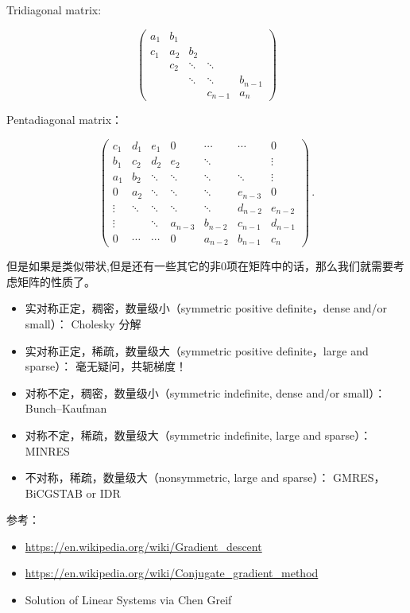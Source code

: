 \documentclass[
]{book}
\providecommand{\tightlist}{%
  \setlength{\itemsep}{0pt}\setlength{\parskip}{0pt}}
\begin{document}
Tridiagonal matrix:

\[
\begin{pmatrix}
a_1 & b_1 \\
c_1 & a_2 & b_2 \\
& c_2 & \ddots & \ddots \\
& & \ddots & \ddots & b_{n-1} \\
& & & c_{n-1} & a_n
\end{pmatrix}
\]

Pentadiagonal matrix：

\[
{\displaystyle {\begin{pmatrix}c_{1}&d_{1}&e_{1}&0&\cdots &\cdots &0\\b_{1}&c_{2}&d_{2}&e_{2}&\ddots &&\vdots \\a_{1}&b_{2}&\ddots &\ddots &\ddots &\ddots &\vdots \\0&a_{2}&\ddots &\ddots &\ddots &e_{n-3}&0\\\vdots &\ddots &\ddots &\ddots &\ddots &d_{n-2}&e_{n-2}\\\vdots &&\ddots &a_{n-3}&b_{n-2}&c_{n-1}&d_{n-1}\\0&\cdots &\cdots &0&a_{n-2}&b_{n-1}&c_{n}\end{pmatrix}}\,.}
\]

但是如果是类似带状,但是还有一些其它的非0项在矩阵中的话，那么我们就需要考虑矩阵的性质了。

\begin{itemize}
\tightlist
\item
  实对称正定，稠密，数量级小（symmetric positive definite，dense and/or small）： Cholesky 分解
\item
  实对称正定，稀疏，数量级大（symmetric positive definite，large and sparse）： 毫无疑问，共轭梯度！
\item
  对称不定，稠密，数量级小（symmetric indefinite, dense and/or small）：Bunch--Kaufman
\item
  对称不定，稀疏，数量级大（symmetric indefinite, large and sparse）： MINRES
\item
  不对称，稀疏，数量级大（nonsymmetric, large and sparse）： GMRES，BiCGSTAB or IDR
\end{itemize}

参考：

\begin{itemize}
\tightlist
\item
  \url{https://en.wikipedia.org/wiki/Gradient_descent}
\item
  \url{https://en.wikipedia.org/wiki/Conjugate_gradient_method}
\item
  Solution of Linear Systems via Chen Greif
\end{itemize}
\end{document}
